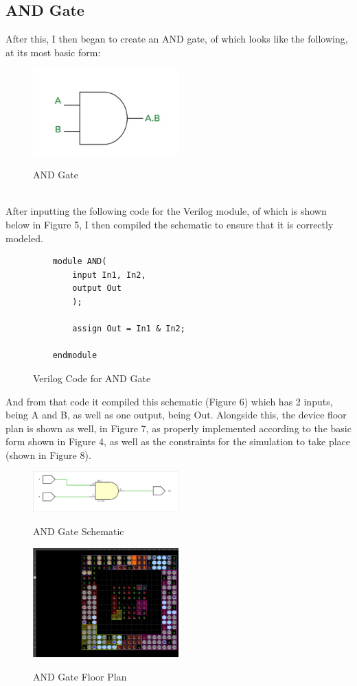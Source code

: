 \documentclass{article}
\begin{document}
\subsection{AND Gate}
After this, I then began to create an AND gate, of which looks like the following, at its most basic form:
\begin{figure}[!htbp]
    \centering
    \caption{AND Gate}
    \includegraphics[width=0.5\textwidth]{AND-GATE.png}
    \label{AND Gate, Simple}
\end{figure}\\
After inputting the following code for the Verilog module, of which is shown below in Figure 5, I then compiled the schematic to ensure that it is correctly modeled.
\begin{figure}[!htbp]
    \centering
    \caption{Verilog Code for AND Gate}
    \begin{verbatim}
    module AND(
        input In1, In2,
        output Out
        );
        
        assign Out = In1 & In2;
        
    endmodule
    \end{verbatim}
\end{figure}\newline
And from that code it compiled this schematic (Figure 6) which has 2 inputs, being A and B, as well as one output, being Out. Alongside this, the device floor plan is shown as well, in Figure 7, as properly implemented according to the basic form shown in Figure 4, as well as the constraints for the simulation to take place (shown in Figure 8).
\begin{figure}[!htbp]
    \centering
    \caption{AND Gate Schematic}
    \includegraphics[width=0.5\textwidth]{AND-GATE-SCHEMATIC.png}
    \label{AND Gate, Schematic}
\end{figure}
\begin{figure}[!htbp]
    \centering
    \caption{AND Gate Floor Plan}
    \includegraphics[width=0.5\textwidth]{AND-GATE-FLOOR-PLAN.png}
    \label{AND Gate, Floor Plan}
\end{figure}
\end{document}
